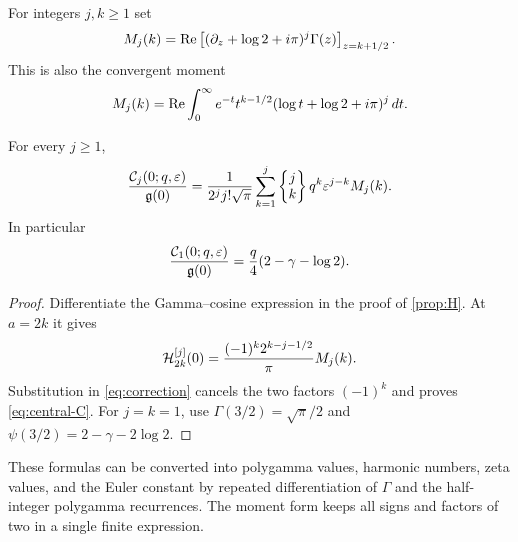 For integers $j,k\ge1$ set
\begin{equation}\label{eq:M-jk}
 M_j(k)=\operatorname{Re}\left[
   (\partial_z+\log2+i\pi)^j\Gamma(z)
                      \right]_{z=k+1/2}.
\end{equation}
This is also the convergent moment
\begin{equation}\label{eq:M-integral}
 M_j(k)=\operatorname{Re}\int_0^\infty e^{-t}t^{k-1/2}
                          (\log t+\log2+i\pi)^j\,dt.
\end{equation}

\begin{corollary}
\label{cor:central-corrections}
For every $j\ge1$,
\begin{equation}\label{eq:central-C}
 \frac{\mathcal C_j(0;q,\varepsilon)}{\mathfrak g(0)}
 =\frac1{2^j j!\sqrt\pi}
     \sum_{k=1}^j\left\{\begin{matrix}j\\k\end{matrix}\right\}q^k\varepsilon^{j-k}M_j(k).
\end{equation}
In particular
\begin{equation}\label{eq:central-first}
 \frac{\mathcal C_1(0;q,\varepsilon)}{\mathfrak g(0)}
 =\frac q4(2-\gamma-\log2).
\end{equation}
\end{corollary}

\begin{proof}
Differentiate the Gamma--cosine expression in the proof of
\cref{prop:H}. At $a=2k$ it gives
\[
 \mathcal H_{2k}^{[j]}(0)=
       \frac{(-1)^k2^{k-j-1/2}}{\pi}M_j(k).
\]
Substitution in \eqref{eq:correction} cancels the two factors
$(-1)^k$ and proves \eqref{eq:central-C}. For $j=k=1$, use
$\Gamma(3/2)=\sqrt\pi/2$ and
$\psi(3/2)=2-\gamma-2\log2$.
\end{proof}

These formulas can be converted into polygamma values, harmonic numbers,
zeta values, and the Euler constant by repeated differentiation of
$\Gamma$ and the half-integer polygamma recurrences. The moment form
keeps all signs and factors of two in a single finite expression.
